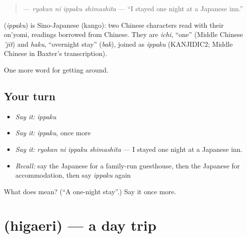 \begin{quote}
\textbf{ } — \emph{ryokan ni ippaku shimashita} — \textquotedblleft{}I stayed one night at a Japanese inn.\textquotedblright{}
\end{quote}

\begin{cousinweb}
\textbf{} (\emph{ippaku}) is Sino-Japanese (kango): two Chinese characters read with their on'yomi, readings borrowed from Chinese. They are \emph{ichi}, \textquotedblleft{}one\textquotedblright{} (Middle Chinese \emph{'jit}) and \emph{haku}, \textquotedblleft{}overnight stay\textquotedblright{} (\emph{bak}), joined as \emph{ippaku} (KANJIDIC2; Middle Chinese in Baxter's transcription).
\end{cousinweb}

\begin{grammarlens}[title={What you've built}]
One more word for getting around.
\end{grammarlens}

\subsection*{Your turn}
\begin{itemize}
\raggedright
  \item \emph{Say it:} \emph{ippaku}
  \item \emph{Say it:} \emph{ippaku}, once more
  \item \emph{Say it:} \emph{ryokan ni ippaku shimashita} — I stayed one night at a Japanese inn.
  \item \emph{Recall:} say the Japanese for a family-run guesthouse, then the Japanese for accommodation, then say \emph{ippaku} again
\end{itemize}

\begin{tcolorbox}[breakable,colback=teal!4,colframe=teal!35!black,title={Before you move on}]
What does  mean? (\textquotedblleft{}A one-night stay\textquotedblright{}.) Say it once more.
\end{tcolorbox}
\section[\texorpdfstring{\ja{ひがえり} (higaeri)}{ひがえり (higaeri)}]{ (higaeri) — a day trip}

\label{lesson:JA-C397-higaeri}



